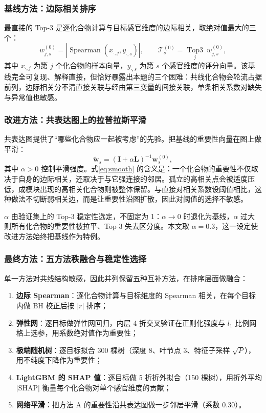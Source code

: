 ﻿\documentclass[UTF8,a4paper,zihao=-4]{ctexart}
\numberwithin{figure}{section}
\numberwithin{table}{section}
\numberwithin{equation}{section}
\newcommand{\bI}{\bm{I}}
\newcommand{\bL}{\bm{L}}
\begin{document}
\subsubsection{基线方法：边际相关排序}

最直接的 Top-3 是逐化合物计算与目标感官维度的边际相关，取绝对值最大的三个：
\begin{equation}
w^{(0)}_{j,s}=\left|\operatorname{Spearman}\left(x_{\cdot,j},y_{\cdot,s}\right)\right|,
\qquad
\mathcal{T}^{(0)}_s=\operatorname*{Top3}_{j}\ w^{(0)}_{j,s},
\label{eq:marginal}
\end{equation}
其中 $x_{\cdot,j}$ 为第 $j$ 个化合物的样本向量，$y_{\cdot,s}$ 为第 $s$ 个感官维度的评分向量。该基线完全可复现、解释直接，但恰好暴露出本题的三个困难：共线化合物会轮流占据前列，边际相关分不清直接关联与经由第三变量的间接关联，单条相关系数对缺失与异常值也敏感。

\subsubsection{改进方法：共表达图上的拉普拉斯平滑}

共表达图提供了“哪些化合物应一起被考虑”的先验。把基线的重要性向量在图上做平滑：
\begin{equation}
\tilde{\bm{w}}_s=\left(\bI+\alpha\bL\right)^{-1}\bm{w}^{(0)}_s,
\label{eq:smooth}
\end{equation}
其中 $\alpha>0$ 控制平滑强度。式\eqref{eq:smooth} 的含义是：一个化合物的重要性不仅取决于自身的边际相关，还取决于与它强连接的邻居。孤立的高相关点会被适度压低，成模块出现的高相关化合物则被整体保留。与直接对相关系数设阈值相比，这种做法不切断弱相关边，而是让重要性沿图扩散，因此对阈值的选择不敏感。

$\alpha$ 由验证集上的 Top-3 稳定性选定，不固定为 1：$\alpha\to0$ 时退化为基线，$\alpha$ 过大则所有化合物的重要性被拉平、Top-3 失去区分度。本文取 $\alpha=0.3$，这一设定使改进方法始终把基线作为特例。

\subsubsection{最终方法：五方法秩融合与稳定性选择}

单一方法对共线结构敏感，因此并列保留五种互补方法，在排序层面做融合：

\begin{enumerate}[label=\textbf{（\Alph*）},leftmargin=2.5em,itemsep=2pt]
  \item \textbf{边际 Spearman}：逐化合物计算与目标维度的 Spearman 相关，在每个目标内做 BH 校正后按 $|r|$ 排序；
  \item \textbf{弹性网}：逐目标做弹性网回归，内层 4 折交叉验证在正则化强度与 $l_1$ 比例网格上选参，用系数绝对值作为重要性；
  \item \textbf{极端随机树}：逐目标拟合 300 棵树（深度 8、叶节点 3、特征子采样 $\sqrt{P}$），用不纯度下降作为重要性；
  \item \textbf{LightGBM 的 SHAP 值}\cite{lundberg2017}：逐目标做 5 折折外拟合（150 棵树），用折外平均 $|\mathrm{SHAP}|$ 衡量每个化合物对单个感官维度的贡献；
  \item \textbf{网络平滑}：把方法 A 的重要性沿共表达图做一步邻居平滑（系数 0.30）。
\end{enumerate}
\end{document}

